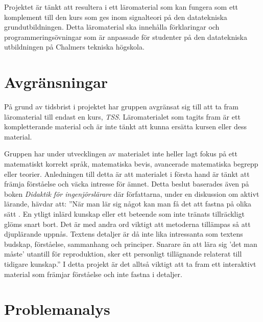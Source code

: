 \documentclass[]{article}
\begin{document}
Projektet är tänkt att resultera i ett läromaterial som kan fungera som ett
komplement till den kurs som ges inom signalteori på den datatekniska
grund\-utbildningen. Detta läromaterial ska innehålla förklaringar och
programmeringsövningar som är anpassade för studenter på den datatekniska
utbildningen på Chalmers tekniska högskola.

\section{Avgränsningar}

På grund av tidsbrist i projektet har gruppen avgränsat sig till att ta fram
läromaterial till endast en kurs, \textit{TSS}. Läromaterialet som tagits fram är ett
kompletterande material och är inte tänkt att kunna ersätta kursen eller
dess material.

Gruppen har under utvecklingen av materialet inte heller lagt fokus på
ett matematiskt korrekt språk, matematiska bevis, avancerade matematiska
begrepp eller teorier. Anledningen till detta är att materialet i
första hand är tänkt att främja förståelse och väcka intresse för
ämnet. Detta beslut baserades även på boken \textit{Didaktik för
 ingenjörslärare} där författarna, under en diskussion om aktivt
lärande, hävdar att: ”När man lär sig något kan man få det att fastna
på olika sätt \cite{didaktik_for_ingenjorslarare}. En ytligt inlärd kunskap eller ett beteende som inte
tränats tillräckligt glöms snart bort. Det är med andra ord viktigt
att metoderna tillämpas så att djuplärande uppnås. Textens detaljer är
då inte lika intressanta som textens budskap, förståelse, sammanhang
och principer. Snarare än att lära sig 'det man måste' utantill för
reproduktion, sker ett personligt tillägnande relaterat till tidigare
kunskap.” I detta projekt är det alltså viktigt att ta fram ett
interaktivt material som främjar förståelse och inte fastna i
detaljer.

\section{Problemanalys}
\end{document}
